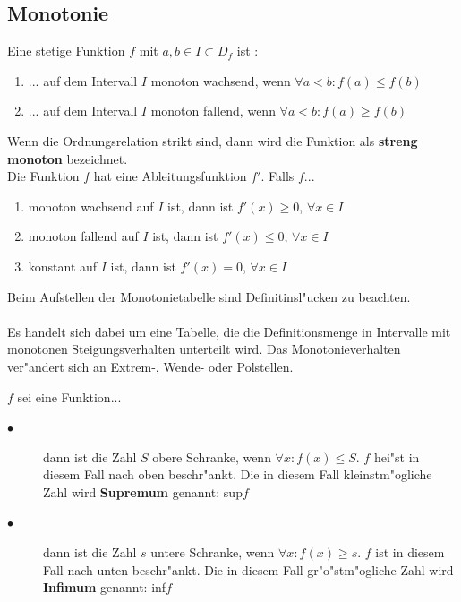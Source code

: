 \subsection{Monotonie}

\begin{Definition}
Eine stetige Funktion $f$ mit $a,b\in I \subset D_{f}$ ist :\\
\begin{enumerate}
\item ... auf dem Intervall $I$ monoton wachsend, wenn $\forall a < b: f(a)\leq f(b)$ 
\item ... auf dem Intervall $I$ monoton fallend, wenn $\forall a < b: f(a) \geq f(b)$ \\
\end{enumerate}
Wenn die Ordnungsrelation strikt sind, dann wird die Funktion als \textbf{streng monoton} bezeichnet.\\
Die Funktion $f$ hat eine Ableitungsfunktion $f'$. Falls $f$...
\begin{enumerate}
\item monoton wachsend auf $I$ ist, dann ist $f'(x)\geq0$, \quad $\forall x \in I$
\item monoton fallend auf $I$ ist, dann ist $f'(x)\leq0$, \quad $\forall x \in I$
\item konstant auf $I$ ist, dann ist $f'(x)=0$, \quad $\forall x \in I$
\end{enumerate}
Beim Aufstellen der Monotonietabelle sind Definitinsl"ucken zu beachten.\\
\\
Es handelt sich dabei um eine Tabelle, die die Definitionsmenge in Intervalle mit monotonen Steigungsverhalten unterteilt wird. Das Monotonieverhalten ver"andert sich an Extrem-, Wende- oder Polstellen.\\
\end{Definition}
\begin{Bemerkung}
$f$ sei eine Funktion...
\begin{description}
\item[$\bullet$] dann ist die Zahl $S$ obere Schranke, wenn $\forall x : f(x)\leq S$. $f$ hei"st in diesem Fall nach oben beschr"ankt. Die in diesem Fall kleinstm"ogliche Zahl wird \textbf{Supremum} genannt: sup$f$
\item[$\bullet$] dann ist die Zahl $s$ untere Schranke, wenn $\forall x : f(x) \geq s$. $f$ ist in diesem Fall nach unten beschr"ankt. Die in diesem Fall gr"o"stm"ogliche Zahl wird \textbf{Infimum} genannt: inf$f$
\end{description}
\end{Bemerkung}
